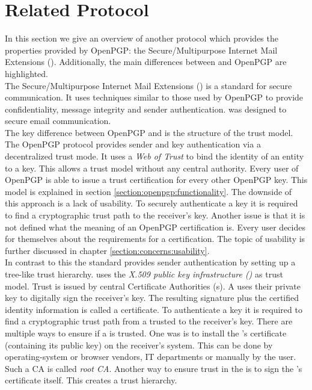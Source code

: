 \section{Related Protocol} \label{section:openpgp:smime}

In this section we give an overview of another protocol which provides the properties provided by OpenPGP: the Secure/Multipurpose Internet Mail Extensions (). Additionally, the main differences between  and OpenPGP are highlighted. \\

The Secure/Multipurpose Internet Mail Extensions () \citep{RFC5751} is a standard for secure communication. It uses techniques similar to those used by OpenPGP to provide confidentiality, message integrity and sender authentication.  was designed to secure email communication.  \\

The key difference between OpenPGP and  is the structure of the trust model.  \\

The {OpenPGP} protocol provides sender and key authentication via a decentralized trust mode. It uses a \textit{Web of Trust} to bind the identity of an entity to a key. This allows a trust model without any central authority. Every user of OpenPGP is able to issue a trust certification for every other OpenPGP key. This model is explained in section \ref{section:openpgp:functionality}. The downside of this approach is a lack of usability. To securely authenticate a key it is required to find a cryptographic trust path to the receiver's key. Another issue is that it is not defined what the meaning of an OpenPGP certification is. Every user decides for themselves about the requirements for a certification. The topic of usability is further discussed in chapter \ref{section:concerns:usability}. \\

In contrast to this the  standard \citep{RFC5751} provides sender authentication by setting up a tree-like trust hierarchy.  uses the \textit{X.509 public key infrastructure ()} \citep{RFC5280} as trust model. Trust is issued by central Certificate Authorities (s). A  uses their private key to digitally sign the receiver's key. The resulting signature plus the certified identity information is called a certificate. To authenticate a key it is required to find a cryptographic trust path from a trusted  to the receiver's key. There are multiple ways to ensure if a  is trusted. One was is to install the 's certificate (containing its public key) on the receiver's system. This can be done by operating-system or browser vendors, IT departments or manually by the user. Such a CA is called \textit{root CA}. Another way to ensure trust in the  is to sign the 's certificate itself. This creates a trust hierarchy. \\

